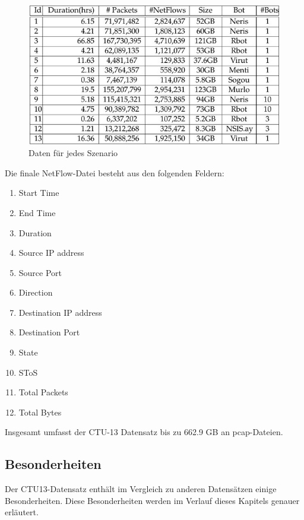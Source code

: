 \documentclass[main.tex]{subfiles}
\begin{document}

\begin{figure}[ht]
 \centering
 \includegraphics[width=1\textwidth]{images/CTU_Tabelle_2.jpg}
 \caption{Daten für jedes Szenario}
 \label{Daten für jedes Szenario}
\end{figure}

Die finale NetFlow-Datei besteht aus den folgenden Feldern:
\begin{center}
\begin{enumerate}
\item Start Time
\item End Time
\item Duration
\item Source IP address
\item Source Port
\item Direction
\item Destination IP address
\item Destination Port
\item State
\item SToS
\item Total Packets
\item Total Bytes
\end{enumerate}
\end{center}
Insgesamt umfasst der CTU-13 Datensatz bis zu 662.9 GB an pcap-Dateien.  \\
\subsection{Besonderheiten}
Der CTU13-Datensatz enthält im Vergleich zu anderen Datensätzen einige Besonderheiten. Diese Besonderheiten werden im Verlauf dieses Kapitels genauer erläutert.
\end{document}
